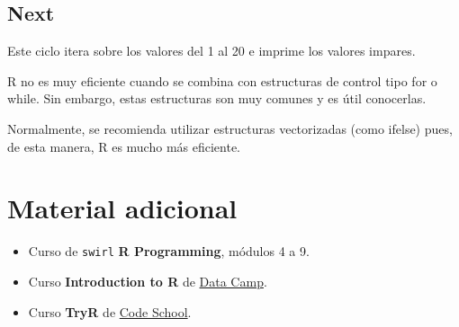 \documentclass[]{article}
\newenvironment{Shaded}{\begin{snugshade}}{\end{snugshade}}
\newcommand{\KeywordTok}[1]{\textcolor[rgb]{0.13,0.29,0.53}{\textbf{#1}}}
\newcommand{\DecValTok}[1]{\textcolor[rgb]{0.00,0.00,0.81}{#1}}
\newcommand{\StringTok}[1]{\textcolor[rgb]{0.31,0.60,0.02}{#1}}
\newcommand{\ControlFlowTok}[1]{\textcolor[rgb]{0.13,0.29,0.53}{\textbf{#1}}}
\newcommand{\OperatorTok}[1]{\textcolor[rgb]{0.81,0.36,0.00}{\textbf{#1}}}
\newcommand{\NormalTok}[1]{#1}
\providecommand{\tightlist}{%
  \setlength{\itemsep}{0pt}\setlength{\parskip}{0pt}}
\begin{document}
\subsection{Next}\label{next}

\begin{Shaded}
\end{Shaded}

Este ciclo itera sobre los valores del 1 al 20 e imprime los valores
impares.

\begin{nota}[Importante]
R no es muy eficiente cuando se combina con estructuras de control tipo for o 
while. Sin embargo, estas estructuras son muy comunes y es útil conocerlas. 

Normalmente, se recomienda utilizar estructuras vectorizadas (como ifelse) pues,
de esta manera, R es mucho más eficiente. 
\end{nota}

\section{Material adicional}\label{material-adicional}

\begin{itemize}
\tightlist
\item
  Curso de \texttt{swirl} \textbf{R Programming}, módulos 4 a 9.
\item
  Curso \textbf{Introduction to R} de
  \href{https://www.datacamp.com/courses/free-introduction-to-r}{Data
  Camp}.
\item
  Curso \textbf{TryR} de \href{http://tryr.codeschool.com/}{Code
  School}.
\end{itemize}
\end{document}
